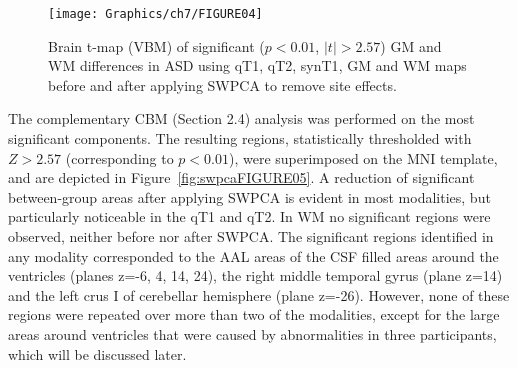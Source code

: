 \begin{figure}
	\centering
	\texttt{[image: Graphics/ch7/FIGURE04]}
	\caption[Brain t-map (\acs{VBM}) of significant ($p<0.01$, $|t|>2.57$) \acs{GM} and \acs{WM} differences in \acs{ASD} using \acs{qT1}, \acs{qT2}, \acs{synT1}, \acs{GM} and \acs{WM} maps before and after applying \acs{SWPCA} to remove site effects.]{Brain t-map (\ac{VBM}) of significant ($p<0.01$, $|t|>2.57$) \ac{GM} and \ac{WM} differences in \ac{ASD} using \ac{qT1}, \ac{qT2}, \ac{synT1}, \ac{GM} and \ac{WM} maps before and after applying \ac{SWPCA} to remove site effects.}
	\label{fig:swpcaFIGURE04}
\end{figure}

The complementary CBM (Section 2.4) analysis was performed on the most
significant components. The resulting regions, statistically
thresholded with $Z>2.57$ (corresponding to $p<0.01$), were superimposed on the
\ac{MNI} template, and are depicted in Figure~\ref{fig:swpcaFIGURE05}. A reduction of significant
between-group areas after applying SWPCA is evident in most modalities,
but particularly noticeable in the \ac{qT1} and \ac{qT2}. In \ac{WM} no significant
regions were observed, neither before nor after SWPCA. The significant
regions identified in any modality corresponded to the AAL areas of the
CSF filled areas around the ventricles (planes z=-6, 4, 14, 24), the
right middle temporal gyrus (plane z=14) and the left crus I of
cerebellar hemisphere (plane z=-26). However, none of these regions
were repeated over more than two of the modalities, except for the
large areas around ventricles that were caused by abnormalities in
three participants, which will be discussed later.

